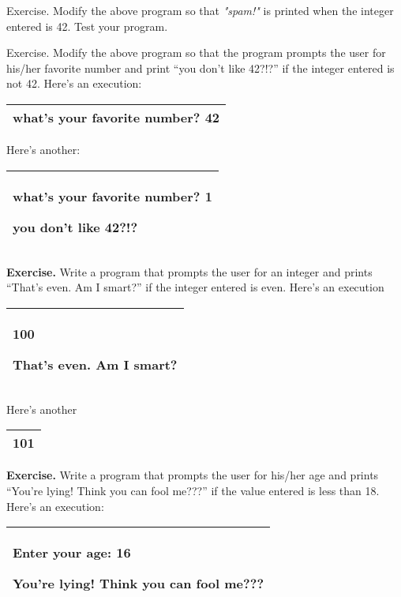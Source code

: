 \documentclass[
]{article}
\begin{document}
Exercise. Modify the above program so that \emph{"spam!"} is printed
when the integer entered is 42. Test your program.

Exercise. Modify the above program so that the program prompts the user
for his/her favorite number and print ``you don't like 42?!?'' if the
integer entered is not 42. Here's an execution:

\begin{longtable}[]{@{}l@{}}
\toprule
\endhead
what's your favorite number? \textbf{42}\tabularnewline
\bottomrule
\end{longtable}

Here's another:

\begin{longtable}[]{@{}l@{}}
\toprule
\endhead
\begin{minipage}[t]{0.97\columnwidth}\raggedright
what's your favorite number? \textbf{1}

you don't like 42?!?\strut
\end{minipage}\tabularnewline
\bottomrule
\end{longtable}

\textbf{Exercise.} Write a program that prompts the user for an integer
and prints ``That's even. Am I smart?'' if the integer entered is even.
Here's an execution

\begin{longtable}[]{@{}l@{}}
\toprule
\endhead
\begin{minipage}[t]{0.97\columnwidth}\raggedright
100

That's even. Am I smart?\strut
\end{minipage}\tabularnewline
\bottomrule
\end{longtable}

Here's another

\begin{longtable}[]{@{}l@{}}
\toprule
\endhead
101\tabularnewline
\bottomrule
\end{longtable}

\textbf{Exercise.} Write a program that prompts the user for his/her age
and prints ``You're lying! Think you can fool me???'' if the value
entered is less than 18. Here's an execution:

\begin{longtable}[]{@{}l@{}}
\toprule
\endhead
\begin{minipage}[t]{0.97\columnwidth}\raggedright
Enter your age: \textbf{16}

You're lying! Think you can fool me???\strut
\end{minipage}\tabularnewline
\bottomrule
\end{longtable}
\end{document}
